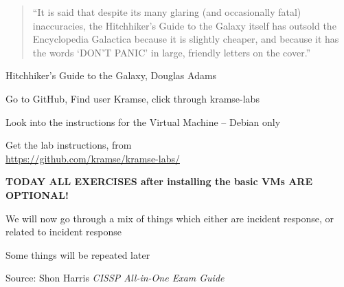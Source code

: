 \documentclass[Screen16to9,17pt]{foils}
\begin{document}
\begin{quote}
“It is said that despite its many glaring (and occasionally fatal) inaccuracies, the Hitchhiker’s Guide to the Galaxy itself has outsold the Encyclopedia Galactica because it is slightly cheaper, and because it has the words ‘DON’T PANIC’ in large, friendly letters on the cover.”
\end{quote}
Hitchhiker’s Guide to the Galaxy, Douglas Adams


\begin{list2}
\item Go to GitHub, Find user Kramse, click through kramse-labs
\item Look into the instructions for the Virtual Machine -- Debian only

\item Get the lab instructions, from\\ {\footnotesize\url{https://github.com/kramse/kramse-labs/}}
\end{list2}

{\bf TODAY ALL EXERCISES after installing the basic VMs ARE OPTIONAL!}







We will now go through a mix of things which either are incident response, or related to incident response

Some things will be repeated later




Source: Shon Harris \emph{CISSP All-in-One Exam Guide}



\end{document}
